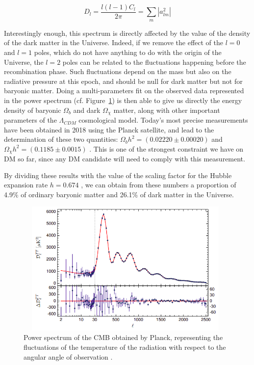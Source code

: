 \documentclass[a4paper, 10pt, openright]{report}
\begin{document}
\begin{equation} \label{equation:PowerSpectrum}
D_l = \frac{l(l-1) C_l} {2\pi} = \sum_m |a_{lm}^2|
\end{equation}

Interestingly enough, this spectrum is directly affected by the value of the density of the dark matter in the Universe. Indeed, if we remove the effect of the $l=0$ and $l=1$ poles, which do not have anything to do with the origin of the Universe, the $l=2$ poles can be related to the fluctuations happening before the recombination phase. Such fluctuations depend on the mass but also on the radiative pressure at this epoch, and should be null for dark matter but not for baryonic matter. Doing a multi-parameters fit on the observed data represented in the power spectrum (cf. Figure~\ref{figure:CMBSpectrum}) is then able to give us directly the energy density of baryonic $\Omega_b$ and dark $\Omega_\chi$ matter, along with other important parameters of the $\Lambda_{CDM}$ cosmological model. Today's most precise measurements have been obtained in 2018 using the Planck satellite, and lead to the determination of these two quantities: $\Omega_b h^2 = (0.02220 \pm 0.00020)$ and $\Omega_\chi h^2 = (0.1185 \pm 0.0015)$ \cite{Planck}. This is one of the strongest constraint we have on \ac{DM} so far, since any \ac{DM} candidate will need to comply with this measurement.

By dividing these results with the value of the scaling factor for the Hubble expansion rate $h = 0.674$ \cite{Constants}, we can obtain from these numbers a proportion of 4.9\% of ordinary baryonic matter and 26.1\% of dark matter in the Universe.

\begin{figure}[htbp]
\begin{center}
\includegraphics[width=11cm, height=6.7cm]{figs/PlanckSpectrum.png}
\caption{Power spectrum of the \ac{CMB} obtained by Planck, representing the fluctuations of the temperature of the radiation with respect to the angular angle of observation \cite{Planck}.}
\label{figure:CMBSpectrum}
\end{center}
\end{figure}
\end{document}
